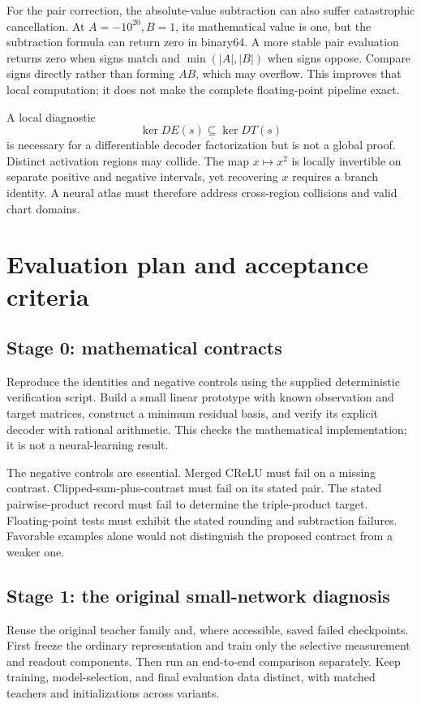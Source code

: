 For the pair correction, the absolute-value subtraction can also suffer
catastrophic cancellation. At \(A=-10^{20},B=1\), its mathematical value is
one, but the subtraction formula can return zero in binary64. A more stable
pair evaluation returns zero when signs match and
\(\min(|A|,|B|)\) when signs oppose. Compare signs directly rather than
forming \(AB\), which may overflow. This improves that local computation;
it does not make the complete floating-point pipeline exact.

A local diagnostic
\[
 \ker DE(s)\subseteq\ker DT(s)
\]
is necessary for a differentiable decoder factorization but is not a
global proof. Distinct activation regions may collide. The map \(x\mapsto
x^2\) is locally invertible on separate positive and negative intervals,
yet recovering \(x\) requires a branch identity. A neural atlas must
therefore address cross-region collisions and valid chart domains.

\section{Evaluation plan and acceptance criteria}
\label{sec:experiments}

\subsection{Stage 0: mathematical contracts}

Reproduce the identities and negative controls using the supplied deterministic
verification script. Build a small linear prototype with known observation and
target matrices, construct a minimum residual basis, and verify its explicit
decoder with rational arithmetic. This checks the mathematical implementation;
it is not a neural-learning result.

The negative controls are essential. Merged CReLU must fail on a missing
contrast. Clipped-sum-plus-contrast must fail on its stated pair. The stated
pairwise-product record must fail to determine the triple-product target. Floating-point tests
must exhibit the stated rounding and subtraction failures. Favorable
examples alone would not distinguish the proposed contract from a weaker one.

\subsection{Stage 1: the original small-network diagnosis}

Reuse the original teacher family and, where accessible, saved failed
checkpoints. First freeze the ordinary representation and train only the
selective measurement and readout components. Then run an end-to-end
comparison separately. Keep training, model-selection, and final evaluation
data distinct, with matched teachers and initializations across variants.

